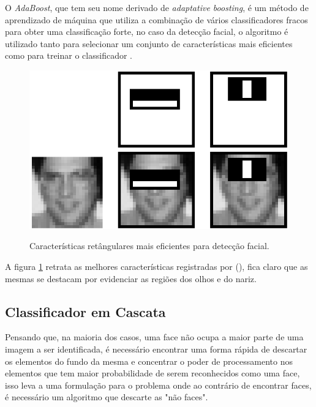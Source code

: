 O \textit{AdaBoost}, que tem seu nome derivado de \textit{adaptative boosting}, é um método de aprendizado de máquina que utiliza a combinação de vários classificadores fracos para obter uma classificação forte, no caso da detecção facial, o algoritmo é utilizado tanto para selecionar um conjunto de características mais eficientes como para treinar o classificador \cite{fabio-luciana-2015}.

\begin{figure}[htb]
    \centering
    \caption{Características retângulares mais eficientes para detecção facial.}
    \includegraphics[scale=.4]{figs/top-features.png}
    \label{fig:top-features}
 \end{figure}

 A figura \ref{fig:top-features} retrata as melhores características registradas por  (\citeyear{paper-viola-jones}), fica claro que as mesmas se destacam por evidenciar as regiões dos olhos e do nariz.

\subsection{Classificador em Cascata}

Pensando que, na maioria dos casos, uma face não ocupa a maior parte de uma imagem a ser identificada, é necessário encontrar uma forma rápida de descartar os elementos do fundo da mesma e concentrar o poder de processamento nos elementos que tem maior probabilidade de serem reconhecidos como uma face, isso leva a uma formulação para o problema onde ao contrário de encontrar faces, é necessário um algoritmo que descarte as "não faces".


